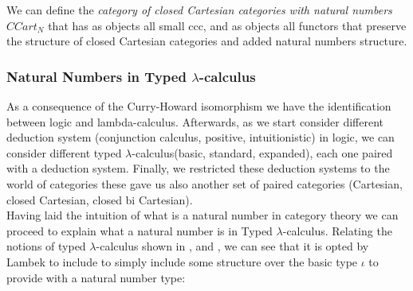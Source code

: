 \begin{definition}
  We can define the \emph{category of closed Cartesian categories with natural numbers} $CCart_N$ that has as objects all small ccc, and as objects all functors that preserve the structure of closed Cartesian categories and added natural numbers structure.\\
\end{definition}


\subsubsection{Natural Numbers in Typed $\lambda$-calculus}\label{section:natural-revisited}

As a consequence of the Curry-Howard isomorphism we have the identification between logic and lambda-calculus. Afterwards, as we start consider different deduction system  (conjunction calculus, positive, intuitionistic) in logic, we can consider different typed $\lambda$-calculus(basic, standard, expanded), each one paired with a deduction system. Finally, we restricted these deduction systems to the world of categories these gave us also another set of paired categories (Cartesian, closed Cartesian, closed bi Cartesian). \\



Having laid the intuition of what is a natural number in category theory we can proceed to explain what a natural number is in Typed $\lambda$-calculus. Relating the notions of typed $\lambda$-calculus shown in \cite[Section 10]{lambek1988introduction}, \cite[Section 6]{selinger2008lecture} and \cite[Section 10]{cardone2006history}, we can see that it is opted by Lambek to include to simply include some structure over the basic type $\iota$  to provide with a natural number type:

